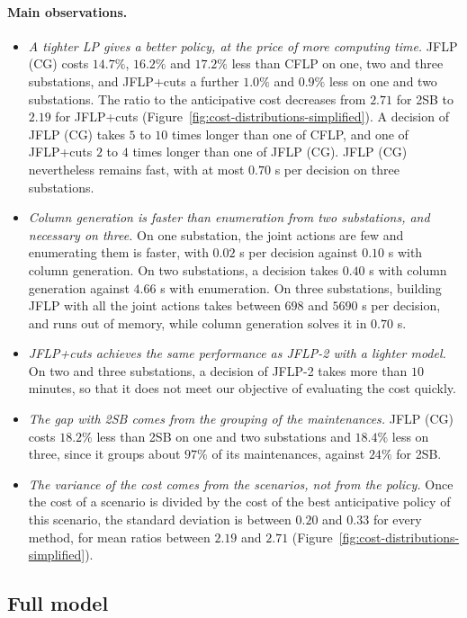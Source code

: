 \documentclass{article}
\begin{document}
\paragraph{Main observations.}
\begin{itemize}
\item \emph{A tighter LP gives a better policy, at the price of more computing time.} JFLP (CG) costs $14.7\%$, $16.2\%$ and $17.2\%$ less than CFLP on one, two and three substations, and JFLP+cuts a further $1.0\%$ and $0.9\%$ less on one and two substations. The ratio to the anticipative cost
decreases from $2.71$ for 2SB to $2.19$ for JFLP+cuts (Figure~\ref{fig:cost-distributions-simplified}). A
decision of JFLP (CG) takes $5$ to $10$ times longer than one of CFLP, and one of JFLP+cuts $2$ to $4$ times longer than one of JFLP (CG). JFLP (CG) nevertheless
remains fast, with at most $0.70$ s per decision on three substations.
\item \emph{Column generation is faster than enumeration from two substations, and necessary on three.} On one
substation, the joint actions are few and enumerating them is faster, with $0.02$ s per decision against $0.10$ s
with column generation. On two substations, a decision takes $0.40$ s with column generation against $4.66$ s with
enumeration. On three substations, building JFLP with all the joint actions takes between $698$ and
$5690$ s per decision, and runs out of memory, while column generation solves it in $0.70$ s.
\item \emph{JFLP+cuts achieves the same performance as JFLP-2 with a lighter model.} On two and three substations, a decision of JFLP-2 takes more than $10$ minutes,
so that it does not meet our objective of evaluating the cost quickly.
\item \emph{The gap with 2SB comes from the grouping of the maintenances.} JFLP (CG) costs $18.2\%$ less than 2SB on one and two substations and $18.4\%$ less on three, since it groups about $97\%$ of
its maintenances, against $24\%$ for 2SB.
\item \emph{The variance of the cost comes from the scenarios, not from the policy.} Once the cost of a scenario is
divided by the cost of the best anticipative policy of this scenario, the standard deviation is between $0.20$ and
$0.33$ for every method, for mean ratios between $2.19$ and $2.71$ (Figure~\ref{fig:cost-distributions-simplified}).
\end{itemize}

\subsection{Full model}
\label{sec:full-model-results}
\end{document}
